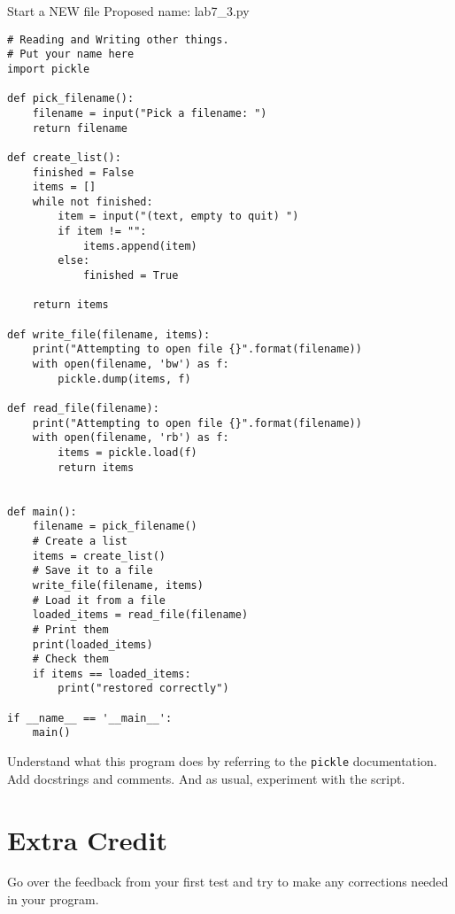 \documentclass[12pt,oneside]{cttutorial}
\begin{document}
\alert{Start a NEW file}
Proposed name: lab7\_3.py
\begin{lstlisting}
# Reading and Writing other things.
# Put your name here
import pickle

def pick_filename():
    filename = input("Pick a filename: ")
    return filename

def create_list():
    finished = False
    items = []
    while not finished:
        item = input("(text, empty to quit) ")
        if item != "":
            items.append(item)
        else:
            finished = True

    return items

def write_file(filename, items):
    print("Attempting to open file {}".format(filename))
    with open(filename, 'bw') as f:
        pickle.dump(items, f)

def read_file(filename):
    print("Attempting to open file {}".format(filename))
    with open(filename, 'rb') as f:
        items = pickle.load(f)
        return items

            
def main():
    filename = pick_filename()
    # Create a list
    items = create_list()
    # Save it to a file
    write_file(filename, items)
    # Load it from a file
    loaded_items = read_file(filename)
    # Print them
    print(loaded_items)
    # Check them
    if items == loaded_items:
        print("restored correctly")

if __name__ == '__main__':
    main()
\end{lstlisting}

Understand what this program does by referring to the \lstinline!pickle! documentation. Add docstrings and comments. And as usual, experiment with the script.


\section{Extra Credit}

Go over the feedback from your first test and try to make any corrections needed in your program.
\end{document}
